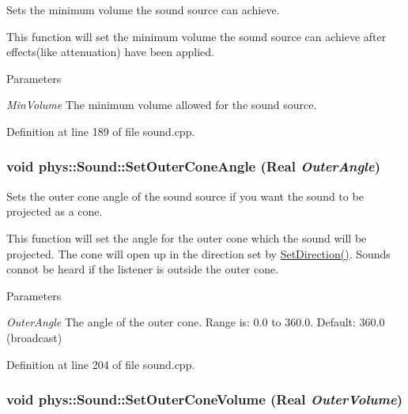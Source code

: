 Sets the minimum volume the sound source can achieve. 

This function will set the minimum volume the sound source can achieve after effects(like attenuation) have been applied. 
\begin{DoxyParams}{Parameters}
\item[{\em MinVolume}]The minimum volume allowed for the sound source. \end{DoxyParams}


Definition at line 189 of file sound.cpp.

\hypertarget{classphys_1_1Sound_a4fc7d07d303ddb97acc15524950d0442}{
\subsubsection[{SetOuterConeAngle}]{\setlength{\rightskip}{0pt plus 5cm}void phys::Sound::SetOuterConeAngle ({\bf Real} {\em OuterAngle})}}
\label{dc/d2f/classphys_1_1Sound_a4fc7d07d303ddb97acc15524950d0442}


Sets the outer cone angle of the sound source if you want the sound to be projected as a cone. 

This function will set the angle for the outer cone which the sound will be projected. The cone will open up in the direction set by \hyperlink{classphys_1_1Sound_af2d6aa7e1b3b2e9f60b8dbbe8aa2d381}{SetDirection()}. Sounds connot be heard if the listener is outside the outer cone. 
\begin{DoxyParams}{Parameters}
\item[{\em OuterAngle}]The angle of the outer cone. Range is: 0.0 to 360.0. Default: 360.0 (broadcast) \end{DoxyParams}


Definition at line 204 of file sound.cpp.

\hypertarget{classphys_1_1Sound_a55b0eadd492fc1a5fbae9848f5682ac9}{
\subsubsection[{SetOuterConeVolume}]{\setlength{\rightskip}{0pt plus 5cm}void phys::Sound::SetOuterConeVolume ({\bf Real} {\em OuterVolume})}}
\label{dc/d2f/classphys_1_1Sound_a55b0eadd492fc1a5fbae9848f5682ac9}


